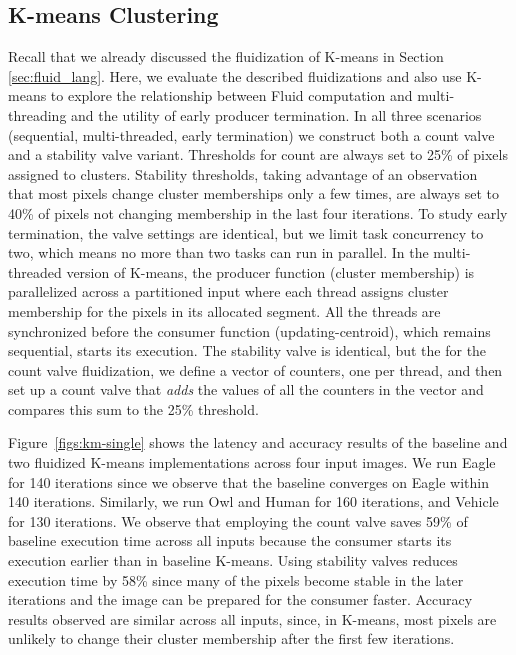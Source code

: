 \subsection{K-means Clustering}
\label{sec:km}
Recall that we already discussed the fluidization of K-means in Section \ref{sec:fluid_lang}. Here, we evaluate the described fluidizations and also use K-means to explore the relationship between Fluid computation and multi-threading and the utility of early producer termination. In all three scenarios (sequential, multi-threaded, early termination) we construct both a count valve and a stability valve variant. Thresholds for count are always set to 25\% of pixels assigned to clusters. Stability thresholds, taking advantage of an observation~\cite{orhan} that most pixels change cluster memberships only a few times, are always set to 40\% of pixels not changing membership in the last four iterations.  To study early termination, the valve settings are identical, but we limit task concurrency to two, which means no more than two tasks can run in parallel. In the multi-threaded version of K-means, the producer function (cluster membership) is parallelized across a partitioned input where each thread assigns cluster membership for the pixels in its allocated segment. All the threads are synchronized before the consumer function (updating-centroid), which remains sequential, starts its execution. The stability valve is identical, but the for the count valve fluidization, we define a vector of counters, one per thread, and then set up a count valve that {\em adds} the values of all the counters in the vector and compares this sum to the 25\% threshold.


Figure~\ref{figs:km-single} shows the latency and accuracy results of the baseline and two fluidized K-means implementations across four input images. We run Eagle for 140 iterations since we observe that the baseline converges on Eagle within 140 iterations. Similarly, we run Owl and Human for 160 iterations, and Vehicle for 130 iterations. We observe that employing the count valve saves 59\% of baseline execution time across all inputs because the consumer starts its execution earlier than in baseline K-means. Using stability valves reduces execution time by 58\% since many of the pixels become stable in the later iterations and the image can be prepared for the consumer faster. Accuracy results observed are similar across all inputs, since, in K-means, most pixels are unlikely to change their cluster membership after the first few iterations\cite{orhan}.

